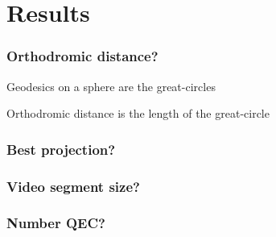 \section{Results}

\begin{frame}[c]
   \frametitle{Orthodromic distance?}

   Geodesics on a sphere are the great-circles

   Orthodromic distance is the length of the great-circle

   \begin{independentCounter}
      
   \end{independentCounter}

\end{frame}

\begin{frame}[c]
   \frametitle{Best projection?}

   \begin{independentCounter}
      
   \end{independentCounter}
\end{frame}

\begin{frame}[c]
   \frametitle{Video segment size?}

   \begin{independentCounter}
      
   \end{independentCounter}
\end{frame}

\begin{frame}[c]
   \frametitle{Number QEC?}

   \begin{independentCounter}
      
   \end{independentCounter}
\end{frame}
